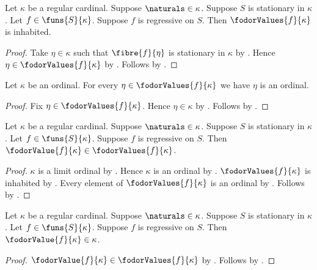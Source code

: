 \begin{proposition}\label{fodor_values_inhabited}
    Let $\kappa$ be a regular cardinal.
    Suppose $\naturals\in\kappa$.
    Suppose $S$ is stationary in $\kappa$.
    Let $f\in\funs{S}{\kappa}$.
    Suppose $f$ is regressive on $S$.
    Then $\fodorValues{f}{\kappa}$ is inhabited.
\end{proposition}
\begin{proof}
    Take $\eta\in\kappa$ such that
        $\fibre{f}{\eta}$ is stationary in $\kappa$ by .
    Hence $\eta\in\fodorValues{f}{\kappa}$ by .
    Follows by \auto.
\end{proof}

\begin{proposition}\label{fodor_values_are_ordinals}
    Let $\kappa$ be an ordinal.
    For every $\eta\in\fodorValues{f}{\kappa}$ we have
        $\eta$ is an ordinal.
\end{proposition}
\begin{proof}
    Fix $\eta\in\fodorValues{f}{\kappa}$.
    Hence $\eta\in\kappa$ by .
    Follows by .
\end{proof}

\begin{proposition}\label{fodor_value_mem}
    Let $\kappa$ be a regular cardinal.
    Suppose $\naturals\in\kappa$.
    Suppose $S$ is stationary in $\kappa$.
    Let $f\in\funs{S}{\kappa}$.
    Suppose $f$ is regressive on $S$.
    Then $\fodorValue{f}{\kappa}\in\fodorValues{f}{\kappa}$.
\end{proposition}
\begin{proof}
    $\kappa$ is a limit ordinal by .
    Hence $\kappa$ is an ordinal by .
    $\fodorValues{f}{\kappa}$ is inhabited
        by .
    Every element of $\fodorValues{f}{\kappa}$ is an ordinal
        by .
    Follows by .
\end{proof}

\begin{proposition}\label{fodor_value_lt}
    Let $\kappa$ be a regular cardinal.
    Suppose $\naturals\in\kappa$.
    Suppose $S$ is stationary in $\kappa$.
    Let $f\in\funs{S}{\kappa}$.
    Suppose $f$ is regressive on $S$.
    Then $\fodorValue{f}{\kappa}\in\kappa$.
\end{proposition}
\begin{proof}
    $\fodorValue{f}{\kappa}\in\fodorValues{f}{\kappa}$
        by .
    Follows by .
\end{proof}

